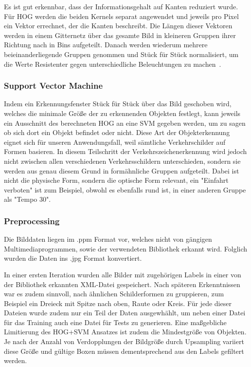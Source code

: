 \documentclass[runningheads]{llncs}
\begin{document}
Es ist gut erkennbar, dass der Informationsgehalt auf Kanten reduziert wurde. Für HOG werden die beiden Kernels separat angewendet und jeweils pro Pixel ein Vektor errechnet, der die Kanten beschreibt. Die Längen dieser Vektoren werden in einem Gitternetz über das gesamte Bild in kleineren Gruppen ihrer Richtung nach in Bins aufgeteilt. Danach werden wiederum mehrere beieinanderliegende Gruppen genommen und Stück für Stück normalisiert, um die Werte Resistenter gegen unterschiedliche Beleuchtungen zu machen~\cite{ref_opencv_hog}.

\subsubsection{Support Vector Machine}
Indem ein Erkennungsfenster Stück für Stück über das Bild geschoben wird, welches die minimale Größe der zu erkennenden Objekten festlegt, kann jeweils ein Ausschnitt des berechneten HOG an eine SVM gegeben werden, um zu sagen ob sich dort ein Objekt befindet oder nicht. Diese Art der Objekterkennung eignet sich für unseren Anwendungsfall, weil sämtliche Verkehrschilder auf Formen basieren. In diesem Teilschritt der Verkehrszeichenerkennung wird jedoch nicht zwischen allen verschiedenen Verkehrsschildern unterschieden, sondern sie werden aus genau diesem Grund in formähnliche Gruppen aufgeteilt. Dabei ist nicht die physische Form, sondern die optische Form relevant, ein "Einfahrt verboten" ist zum Beispiel, obwohl es ebenfalls rund ist, in einer anderen Gruppe als "Tempo 30".

\subsubsection{Preprocessing}
Die Bilddaten liegen im .ppm Format vor, welches nicht von gängigen Multimediaprogrammen, sowie der verwendeten Bibliothek erkannt wird. Folglich wurden die Daten ins .jpg Format konvertiert.

In einer ersten Iteration wurden alle Bilder mit zugehörigen Labels in einer von der Bibliothek erkannten XML-Datei gespeichert. Nach späteren Erkenntnissen war es zudem sinnvoll, nach ähnlichen Schilderformen zu gruppieren, zum Beispiel ein Dreieck mit Spitze nach oben, Raute oder Kreis. Für jede dieser Dateien wurde zudem nur ein Teil der Daten ausgewhählt, um neben einer Datei für das Training auch eine Datei für Tests zu generieren.
Eine maßgebliche Limitierung des HOG+SVM Ansatzes ist zudem die Mindestgröße von Objekten. Je nach der Anzahl von Verdopplungen der Bildgröße durch Upsampling variiert diese Größe und gültige Boxen müssen dementsprechend aus den Labels gefiltert werden.
\end{document}
